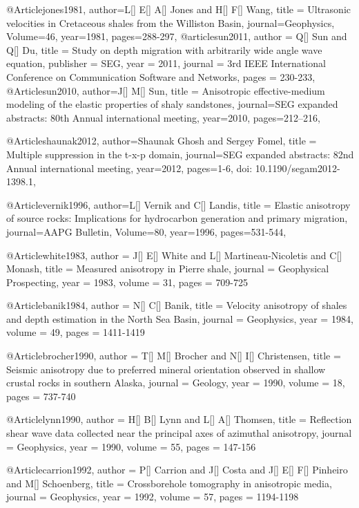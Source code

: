 @Article{jones1981,
  author={L[] E[] A[] Jones and H[] F[] Wang},
  title = {Ultrasonic velocities in Cretaceous shales from the Williston Basin},
  journal={Geophysics},
  Volume=46,
  year=1981,
  pages={288-297},
}
@article{sun2011,
  author =	 {Q[] Sun and Q[] Du},
  title =	 {Study on depth migration with arbitrarily wide angle wave equation},
  publisher =	 {SEG},
  year =	 2011,
  journal =	 {3rd IEEE International Conference on Communication Software and Networks},
  pages =	 {230-233},
}
@Article{sun2010,
  author={J[] M[] Sun},
  title = {Anisotropic effective-medium modeling of the elastic properties of shaly sandstones},
  journal={SEG expanded abstracts: 80th Annual international meeting},
  year=2010,
  pages={212–216},
}


@Article{shaunak2012,
  author={Shaunak Ghosh and Sergey Fomel},
  title = {Multiple suppression in the t-x-p domain},
  journal={SEG expanded abstracts: 82nd Annual international meeting},
  year=2012,
  pages={1-6, doi: 10.1190/segam2012-1398.1},
}

@Article{vernik1996,
  author={L[] Vernik and C[] Landis},
  title = {Elastic anisotropy of source rocks: Implications for hydrocarbon
generation and primary migration},
  journal={AAPG Bulletin},
  Volume=80,
  year=1996,
  pages={531-544},
}

@Article{white1983,
  author = 	 {J[] E[] White and L[] Martineau-Nicoletis and C[] Monash},
  title = 	 {Measured anisotropy in Pierre shale},
  journal = 	 {Geophysical Prospecting},
  year = 	 1983,
  volume =	 31,
  pages =	 {709-725}
}

@Article{banik1984,
  author = 	 {N[] C[] Banik},
  title = 	 {Velocity anisotropy of shales and depth estimation
in the North Sea Basin},
  journal = 	 {Geophysics},
  year = 	 1984,
  volume =	 49,
  pages =	 {1411-1419}
}

@Article{brocher1990,
  author = 	 {T[] M[] Brocher and N[] I[] Christensen},
  title = 	 {Seismic anisotropy due to preferred mineral orientation observed in shallow crustal rocks
in southern Alaska},
  journal = 	 {Geology},
  year = 	 1990,
  volume =	 18,
  pages =	 {737-740}
}

@Article{lynn1990,
  author = 	 {H[] B[] Lynn and L[] A[] Thomsen},
  title = 	 {Reflection shear wave data collected near the principal axes of azimuthal anisotropy},
  journal = 	 {Geophysics},
  year = 	 1990,
  volume =	 55,
  pages =	 {147-156}
}

@Article{carrion1992,
  author = 	 {P[] Carrion and J[] Costa and J[] E[] F[] Pinheiro and M[] Schoenberg},
  title = 	 {Crossborehole tomography in anisotropic media},
  journal = 	 {Geophysics},
  year = 	 1992,
  volume =	 57,
  pages =	 {1194-1198}
}

